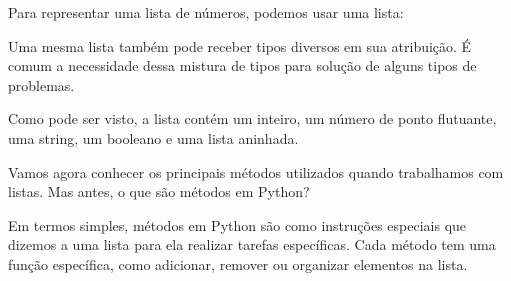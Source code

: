 \documentclass[letterpaper,10pt,english]{jupyterBook}
\begin{document}
\sphinxAtStartPar
Para representar uma lista de números, podemos usar uma lista:

\begin{sphinxVerbatim}[commandchars=\\\{\}]
  \PYG{p}{[}    \PYG{p}{]}
\end{sphinxVerbatim}

\sphinxAtStartPar
Uma mesma lista também pode receber tipos diversos em sua atribuição. É comum a necessidade dessa mistura de tipos para solução de alguns tipos de problemas.

\begin{sphinxVerbatim}[commandchars=\\\{\}]
  \PYG{p}{[}    \PYG{p}{[}  \PYG{p}{]}\PYG{p}{]}
\end{sphinxVerbatim}

\sphinxAtStartPar
Como pode ser visto, a lista  contém um inteiro, um número de ponto flutuante, uma string, um booleano e uma lista aninhada.

\sphinxAtStartPar
Vamos agora conhecer os principais métodos utilizados quando trabalhamos com listas. Mas antes, o que são métodos em Python?

\sphinxAtStartPar
Em termos simples, métodos em Python são como instruções especiais que dizemos a uma lista para ela realizar tarefas específicas. Cada método tem uma função específica, como adicionar, remover ou organizar elementos na lista.
\end{document}
